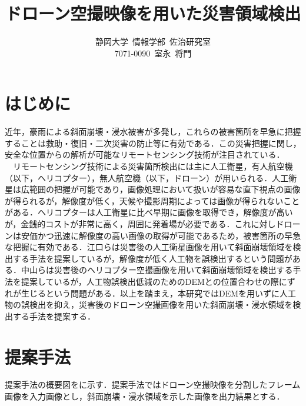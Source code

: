 \documentclass[a4paper, twocolumn, xelatex, 10pt, ja=standard, Ligatures=TeX]{bxjsarticle}
\title{\LARGE ドローン空撮映像を用いた災害領域検出}
\author{静岡大学\ 情報学部\ 佐治研究室 \\ 7071-0090\ 室永\ 将門}
\date{}
\begin{document}
	
	\maketitle

	\section{はじめに}
		近年，豪雨による斜面崩壊・浸水被害が多発し，これらの被害箇所を早急に把握することは救助・復旧・二次災害の防止等に有効である．この災害把握に関し，安全な位置からの解析が可能なリモートセンシング技術が注目されている．\\
		　リモートセンシング技術による災害箇所検出には主に人工衛星，有人航空機（以下，ヘリコプター），無人航空機（以下，ドローン）が用いられる．人工衛星は広範囲の把握が可能であり，画像処理において扱いが容易な直下視点の画像が得られるが，解像度が低く，天候や撮影周期によっては画像が得られないことがある．ヘリコプターは人工衛星に比べ早期に画像を取得でき，解像度が高いが，金銭的コストが非常に高く，周囲に発着場が必要である．これに対しドローンは安価かつ迅速に解像度の高い画像の取得が可能であるため，被害箇所の早急な把握に有効である．江口ら\cite{art01}は災害後の人工衛星画像を用いて斜面崩壊領域を検出する手法を提案しているが，解像度が低く人工物を誤検出するという問題がある．中山\cite{art02}らは災害後のヘリコプター空撮画像を用いて斜面崩壊領域を検出する手法を提案しているが，人工物誤検出低減のためのDEMとの位置合わせの際にずれが生じるという問題がある．以上を踏まえ，本研究ではDEMを用いずに人工物の誤検出を抑え，災害後のドローン空撮画像を用いた斜面崩壊・浸水領域を検出する手法を提案する．
		

	\section{提案手法}
		提案手法の概要図をに示す．提案手法ではドローン空撮映像を分割したフレーム画像を入力画像とし，斜面崩壊・浸水領域を示した画像を出力結果とする．
	
		
\end{document}
